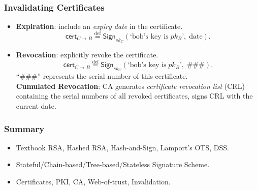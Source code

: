 \begin{frame}\frametitle{Invalidating Certificates}
\begin{itemize}
\item \textbf{Expiration}: include an \emph{expiry date} in the certificate.
\[\mathsf{cert}_{C \to B} \overset{\text{def}}{=} \mathsf{Sign}_{sk_C}(\text{`bob's key is}\; pk_B \text{'},\; \text{date}). \]
\item \textbf{Revocation}: explicitly revoke the certificate.
\[\mathsf{cert}_{C \to B} \overset{\text{def}}{=} \mathsf{Sign}_{sk_C}(\text{`bob's key is}\; pk_B \text{'},\; \text{\#\#\#}).  \]
``\#\#\#'' represents the serial number of this certificate.\\
\textbf{Cumulated Revocation}: CA generates \emph{certificate revocation list} (CRL) containing the serial numbers of all revoked certificates, signs CRL with the current date. 
\end{itemize}
\end{frame}
\begin{frame}\frametitle{Summary}
\begin{itemize}
\item Textbook RSA, Hashed RSA, Hash-and-Sign, Lamport's OTS, DSS.
\item Stateful/Chain-based/Tree-based/Stateless Signature Scheme.
\item Certificates, PKI, CA, Web-of-trust, Invalidation.
\end{itemize}
\end{frame}
